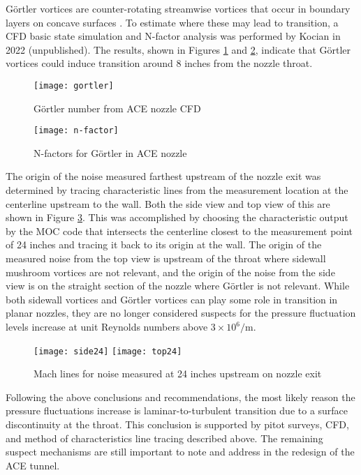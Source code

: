 Görtler vortices are counter-rotating streamwise vortices that occur in boundary layers on concave surfaces \cite{saric}. To estimate where these may lead to transition, a CFD basic state simulation and N-factor analysis was performed by Kocian in 2022 (unpublished). The results, shown in Figures \ref{fig:gortler} and \ref{fig:n-factor}, indicate that Görtler vortices could induce transition around 8 inches from the nozzle throat. 

\begin{figure}[ht!]
    \centering
    \texttt{[image: gortler]}
    \caption{Görtler number from ACE nozzle CFD}
    \label{fig:gortler}
\end{figure}

\begin{figure}[ht!]
    \centering
    \texttt{[image: n-factor]}
    \caption{N-factors for Görtler in ACE nozzle}
    \label{fig:n-factor}
\end{figure}

The origin of the noise measured farthest upstream of the nozzle exit was determined by tracing characteristic lines from the measurement location at the centerline upstream to the wall. Both the side view and top view of this are shown in Figure \ref{fig:machlines}. This was accomplished by choosing the characteristic output by the MOC code that intersects the centerline closest to the measurement point of 24 inches and tracing it back to its origin at the wall. The origin of the measured noise from the top view is upstream of the throat where sidewall mushroom vortices are not relevant, and the origin of the noise from the side view is on the straight section of the nozzle where Görtler is not relevant. While both sidewall vortices and Görtler vortices can play some role in transition in planar nozzles, they are no longer considered suspects for the pressure fluctuation levels increase at unit Reynolds numbers above $3 \times 10^6/\mathrm{m}$.

\begin{figure}[ht!]
    \centering
    \texttt{[image: side24]}
    \texttt{[image: top24]}
    \caption{Mach lines for noise measured at 24 inches upstream on nozzle exit}
    \label{fig:machlines}
\end{figure}

Following the above conclusions and recommendations, the most likely reason the pressure fluctuations increase is laminar-to-turbulent transition due to a surface discontinuity at the throat. This conclusion is supported by pitot surveys, CFD, and method of characteristics line tracing described above. The remaining suspect mechanisms are still important to note and address in the redesign of the ACE tunnel. 

